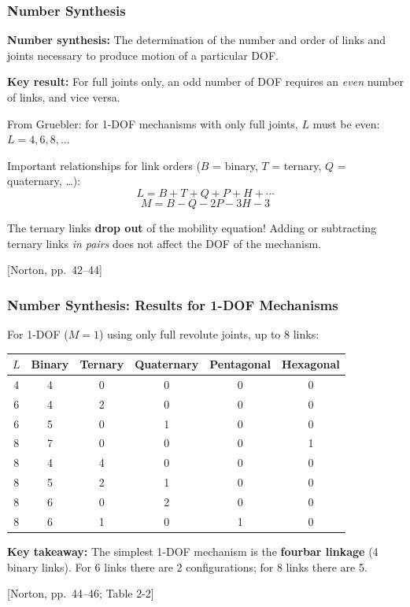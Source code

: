 \documentclass[10pt,aspectratio=43]{beamer}
\newcommand{\pref}[1]{\vfill\hfill{\scriptsize\color{gray}[Norton, pp.~#1]}}
\begin{document}
\begin{frame}
\frametitle{Number Synthesis}

\begin{yellowbox}
\textbf{Number synthesis:} The determination of the number and order of links and joints necessary to produce motion of a particular DOF.
\end{yellowbox}

\vspace{4pt}
\textbf{Key result:} For full joints only, an odd number of DOF requires an \emph{even} number of links, and vice versa.

\vspace{4pt}
From Gruebler: for 1-DOF mechanisms with only full joints, $L$ must be even: $L = 4, 6, 8, \ldots$

\vspace{6pt}
Important relationships for link orders ($B$ = binary, $T$ = ternary, $Q$ = quaternary, \ldots):
\[
  L = B + T + Q + P + H + \cdots \tag{2.4a}
\]
\[
  M = B - Q - 2P - 3H - 3 \tag{2.4e}
\]

\begin{redbox}
The ternary links \textbf{drop out} of the mobility equation! Adding or subtracting ternary links \emph{in pairs} does not affect the DOF of the mechanism.
\end{redbox}
\pref{42--44}
\end{frame}

\begin{frame}
\frametitle{Number Synthesis: Results for 1-DOF Mechanisms}

For 1-DOF ($M=1$) using only full revolute joints, up to 8 links:

\begin{center}
\small
\begin{tabular}{c|ccccc}
\toprule
$L$ & Binary & Ternary & Quaternary & Pentagonal & Hexagonal \\
\midrule
4 & 4 & 0 & 0 & 0 & 0 \\
\midrule
6 & 4 & 2 & 0 & 0 & 0 \\
6 & 5 & 0 & 1 & 0 & 0 \\
\midrule
8 & 7 & 0 & 0 & 0 & 1 \\
8 & 4 & 4 & 0 & 0 & 0 \\
8 & 5 & 2 & 1 & 0 & 0 \\
8 & 6 & 0 & 2 & 0 & 0 \\
8 & 6 & 1 & 0 & 1 & 0 \\
\bottomrule
\end{tabular}
\end{center}

\vspace{4pt}
\begin{yellowbox}
\textbf{Key takeaway:} The simplest 1-DOF mechanism is the \textbf{fourbar linkage} (4 binary links). For 6 links there are 2 configurations; for 8 links there are 5.
\end{yellowbox}
\pref{44--46; Table 2-2}
\end{frame}
\end{document}
